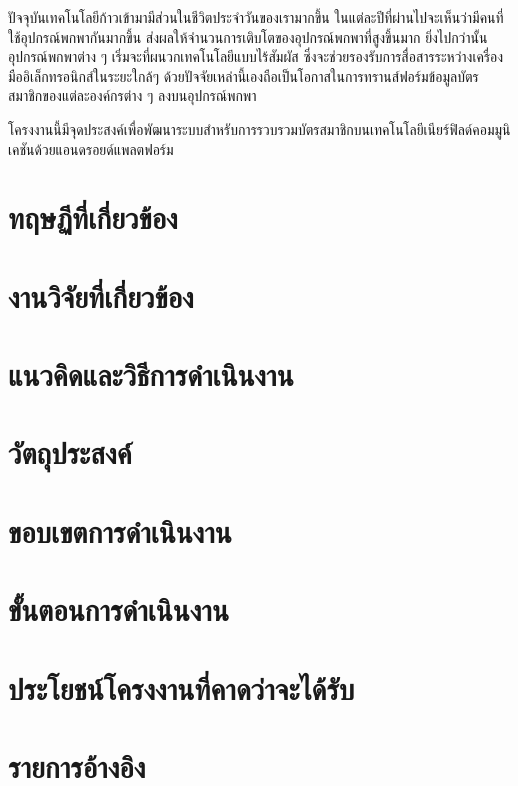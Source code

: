\documentclass[a4paper]{article}
\begin{document}
ปัจจุบันเทคโนโลยีก้าวเข้ามามีส่วนในชีวิตประจำวันของเรามากขึ้น ในแต่ละปีที่ผ่านไปจะเห็นว่ามีคนที่ใช้อุปกรณ์พกพากันมากขึ้น ส่งผลให้จำนวนการเติบโตของอุปกรณ์พกพาที่สูงขึ้นมาก ยิ่งไปกว่านั้นอุปกรณ์พกพาต่าง ๆ เริ่มจะที่ผนวกเทคโนโลยีแบบไร้สัมผัส ซึ่งจะช่วยรองรับการสื่อสารระหว่างเครื่องมืออิเล็กทรอนิกส์ในระยะใกล้ๆ ด้วยปัจจัยเหล่านี้เองถือเป็นโอกาสในการทรานส์ฟอร์มข้อมูลบัตรสมาชิกของแต่ละองค์กรต่าง ๆ ลงบนอุปกรณ์พกพา

โครงงานนี้มีจุดประสงค์เพื่อพัฒนาระบบสำหรับการรวบรวมบัตรสมาชิกบนเทคโนโลยีเนียร์ฟิลด์คอมมูนิเคชันด้วยแอนดรอยด์แพลตฟอร์ม
\section{ทฤษฏีที่เกี่ยวข้อง}

\section{งานวิจัยที่เกี่ยวข้อง}

\section{แนวคิดและวิธีการดำเนินงาน}

\section{วัตถุประสงค์}

\section{ขอบเขตการดำเนินงาน}

\section{ขั้นตอนการดำเนินงาน}

\section{ประโยชน์โครงงานที่คาดว่าจะได้รับ}

\section{รายการอ้างอิง}
\end{document}
